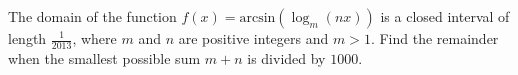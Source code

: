 The domain of the function $f(x) = \text{arcsin}(\log_{m}(nx))$ is a closed interval of length $\frac{1}{2013}$, where $m$ and $n$ are positive integers and $m > 1$. Find the remainder when the smallest possible sum $m+n$ is divided by $1000$.